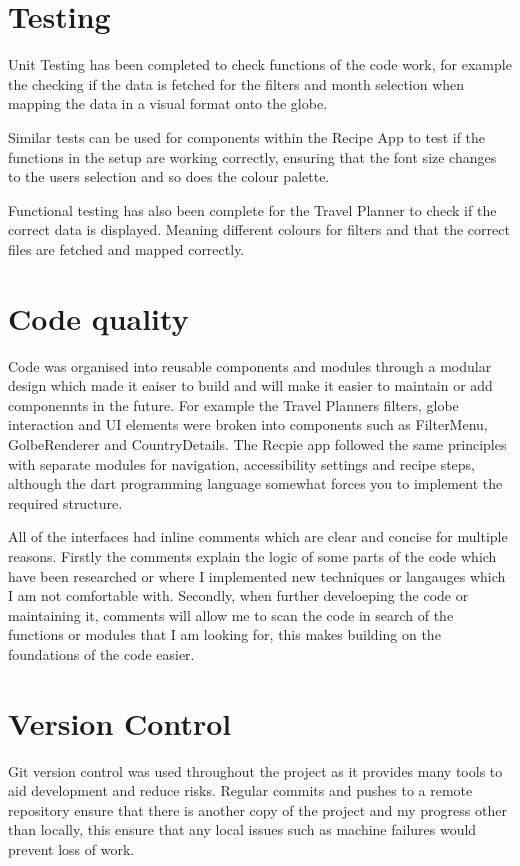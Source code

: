 \documentclass[]{project_interim}
\begin{document}
\section{Testing}

Unit Testing has been completed to check functions of the code work, for example the checking if the data is fetched for the filters and month selection when mapping the data in a visual format onto the globe.

Similar tests can be used for components within the Recipe App to test if the functions in the setup are working correctly, ensuring that the font size changes to the users selection and so does the colour palette.

Functional testing has also been complete for the Travel Planner to check if the correct data is displayed. Meaning different colours for filters and that the correct files are fetched and mapped correctly.

\section{Code quality}

Code was organised into reusable components and modules through a modular design which made it eaiser to build and will make it easier to maintain or add componennts in the future.
For example the Travel Planners filters, globe interaction and UI elements were broken into components such as FilterMenu, GolbeRenderer and CountryDetails.
The Recpie app followed the same principles with separate modules for navigation, accessibility settings and recipe steps, although the dart programming language somewhat forces you to implement the required structure.

All of the interfaces had inline comments which are clear and concise for multiple reasons. Firstly the comments explain the logic of some parts of the code which have been researched or where I implemented new techniques or langauges which I am not comfortable with.
Secondly, when further develoeping the code or maintaining it, comments will allow me to scan the code in search of the functions or modules that I am looking for, this makes building on the foundations of the code easier.

\section{Version Control}
Git version control was used throughout the project as it provides many tools to aid development and reduce risks.
Regular commits and pushes to a remote repository ensure that there is another copy of the project and my progress other than locally, this ensure that any local issues such as machine failures would prevent loss of work.
\end{document}
